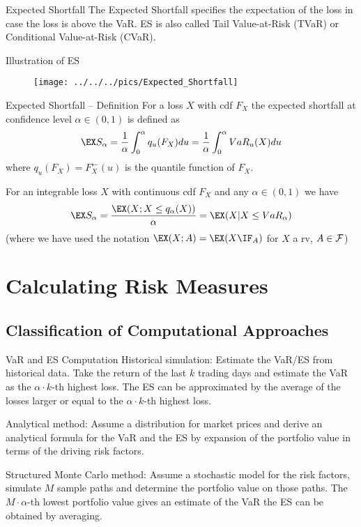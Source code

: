 Expected Shortfall
	The Expected Shortfall specifies the expectation of the loss in case the loss is above the VaR.
	ES is also called Tail Value-at-Risk (TVaR) or Conditional Value-at-Risk (CVaR).


Illustration of ES
\begin{figure}
	\centering
		\texttt{[image: ../../../pics/Expected\_Shortfall]}
	\label{fig:Expected_Shortfall}
\end{figure}


Expected Shortfall -- Definition
	For a loss $X$ with  cdf $F_X$ the expected
	shortfall at confidence level $\alpha\in(0,1)$ is defined as
		$$
		\EX S_{\alpha}=\frac{1}{\alpha}\int_0^{\alpha} q_u(F_X)du
		=\frac{1}{\alpha}\int_0^{\alpha} VaR_u(X)du
		$$
	where $q_u(F_X)=F_X^{\leftarrow}(u)$ is the quantile function of $F_X$.
	
	For an integrable loss $X$ with continuous cdf $F_X$ and any $\alpha\in(0,1)$ we have
		$$
		\EX S_{\alpha}=\frac{\EX(X; X\leq
		q_{\alpha}(X))}{\alpha}=\EX(X|X\leq VaR_{\alpha})
		$$
	(where we have used the notation $\EX(X; A)=\EX(X \IF_A)$ for $X$ a rv, $A\in\cal F $)


\section{Calculating Risk Measures}
\subsection{Classification of Computational Approaches}

VaR and ES Computation
	Historical simulation: Estimate the VaR/ES from historical data.
	Take the return of the last $k$ trading days and estimate the VaR 	
	as the $\alpha \cdot k$-th highest loss. The ES can be approximated 
	by the average of the losses larger or equal to the $\alpha \cdot k$-th highest loss.
	
	Analytical method: Assume a distribution for market prices and derive an analytical 
	formula for the VaR and the ES by expansion of the portfolio value in terms of the 
	driving risk factors.
	
	Structured Monte Carlo method: Assume a stochastic model for the risk factors, 
	simulate $M$ sample paths and determine the portfolio value on those paths. 
	The  $M \cdot \alpha$-th lowest portfolio value gives an estimate of the VaR 
	the ES can be obtained by averaging.


